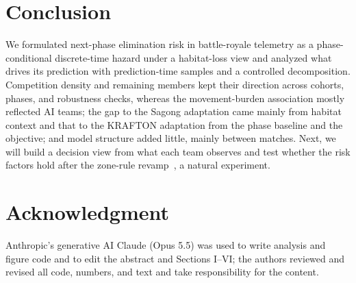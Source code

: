\documentclass[conference]{IEEEtran}
\begin{document}
\section{Conclusion}
\label{sec:conclusion}
We formulated next-phase elimination risk in battle-royale telemetry as a phase-conditional discrete-time hazard under a habitat-loss view and analyzed what drives its prediction with prediction-time samples and a controlled decomposition.
Competition density and remaining members kept their direction across cohorts, phases, and robustness checks, whereas the movement-burden association mostly reflected AI teams; the gap to the Sagong adaptation came mainly from habitat context and that to the KRAFTON adaptation from the phase baseline and the objective; and model structure added little, mainly between matches.
Next, we will build a decision view from what each team observes and test whether the risk factors hold after the zone-rule revamp~\cite{PUBGBlueZone2026}, a natural experiment.

\section*{Acknowledgment}
Anthropic's generative AI Claude (Opus 5.5) was used to write analysis and figure code and to edit the abstract and Sections I--VI; the authors reviewed and revised all code, numbers, and text and take responsibility for the content.



\end{document}
